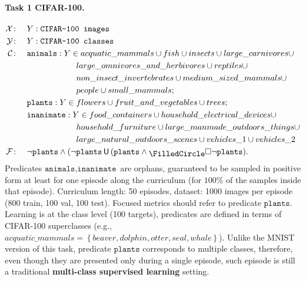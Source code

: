 \paragraph{Task 1 CIFAR-100.}
\begin{align*}
 \gX\colon\quad&Y: \texttt{CIFAR-100 images}\\
 \gY\colon\quad&Y: \texttt{CIFAR-100 classes}\\
 \gC\colon\quad&\texttt{animals}: Y \in acquatic\_mammals \cup fish \cup insects \cup large\_carnivores \cup \\
 &\quad\quad\quad\quad\quad\quad large\_omnivores\_and\_herbivores \cup reptiles \cup \\
 &\quad\quad\quad\quad\quad\quad non\_insect\_invertebrates \cup  medium\_sized\_mammals \cup \\
 & \quad\quad\quad\quad\quad\quad people \cup small\_mammals;\\
 &\texttt{plants}: Y \in flowers \cup fruit\_and\_vegetables \cup trees;\\
 &\texttt{inanimate}: Y \in food\_containers \cup household\_electrical\_devices \cup \\
 &\quad\quad\quad\quad\quad\quad household\_furniture \cup large\_manmade\_outdoors\_things \cup \\
 &\quad\quad\quad\quad\quad\quad large\_natural\_outdoors\_scenes \cup vehicles\_1 \cup vehicles\_2\\
 \gF\colon\quad&\neg \texttt{plants} \wedge (\neg \texttt{plants} \ltluntil (\texttt{plants} \wedge \ltlweaknext \ltlglobally \neg \texttt{plants}).
\end{align*}
Predicates $\texttt{animals}, \texttt{inanimate}$ are orphans, guaranteed to be sampled in positive form at least for one episode along the curriculum (for $100\%$ of the samples inside that episode). Curriculum length: 50 episodes, dataset: 1000 images per episode (800 train, 100 val, 100 test). Focused metrics should refer to predicate $\texttt{plants}$.
Learning is at the class level (100 targets), predicates are defined in terms of CIFAR-100 superclasses (e.g., $acquatic\_mammals = \left\{beaver, dolphin, otter, seal, whale\right\}$).
Unlike the MNIST version of this task, predicate $\texttt{plants}$ corresponds to multiple classes, therefore, even though they are presented only during a single episode, such episode is still a traditional \textbf{multi-class supervised learning} setting.

